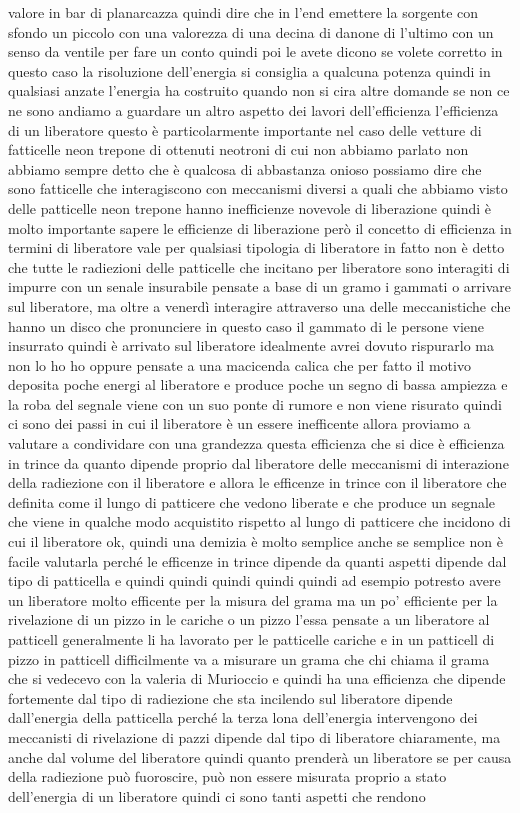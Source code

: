 valore in bar di planarcazza quindi dire che in l'end emettere la sorgente con sfondo un piccolo con una valorezza di una decina di danone di l'ultimo con un senso da ventile per fare un conto quindi poi le avete dicono se volete corretto in questo caso la risoluzione dell'energia si consiglia a qualcuna potenza quindi in qualsiasi anzate l'energia ha costruito quando non si cira altre domande se non ce ne sono andiamo a guardare un altro aspetto dei lavori dell'efficienza l'efficienza di un liberatore questo è particolarmente importante nel caso delle vetture di fatticelle neon trepone di ottenuti neotroni di cui non abbiamo parlato non abbiamo sempre detto che è qualcosa di abbastanza onioso possiamo dire che sono fatticelle che interagiscono con meccanismi diversi a quali che abbiamo visto delle patticelle neon trepone hanno inefficienze novevole di liberazione quindi è molto importante sapere le efficienze di liberazione però il concetto di efficienza in termini di liberatore vale per qualsiasi tipologia di liberatore in fatto non è detto che tutte le radiezioni delle patticelle che incitano per liberatore sono interagiti di impurre con un senale insurabile pensate a base di un gramo i gammati o arrivare sul liberatore, ma oltre a venerdì interagire attraverso una delle meccanistiche che hanno un disco che pronunciere in questo caso il gammato di le persone viene insurrato quindi è arrivato sul liberatore idealmente avrei dovuto rispurarlo ma non lo ho ho oppure pensate a una macicenda calica che per fatto il motivo deposita poche energi al liberatore e produce poche un segno di bassa ampiezza e la roba del segnale viene con un suo ponte di rumore e non viene risurato quindi ci sono dei passi in cui il liberatore è un essere inefficente allora proviamo a valutare a condividare con una grandezza questa efficienza che si dice è efficienza in trince da quanto dipende proprio dal liberatore delle meccanismi di interazione della radiezione con il liberatore e allora le efficenze in trince con il liberatore che definita come il lungo di patticere che vedono liberate e che produce un segnale che viene in qualche modo acquistito rispetto al lungo di patticere che incidono di cui il liberatore ok, quindi una demizia è molto semplice anche se semplice non è facile valutarla perché le efficenze in trince dipende da quanti aspetti dipende dal tipo di patticella e quindi quindi quindi quindi quindi ad esempio potresto avere un liberatore molto efficente per la misura del grama ma un po' efficiente per la rivelazione di un pizzo in le cariche o un pizzo l'essa pensate a un liberatore al patticell generalmente li ha lavorato per le patticelle cariche e in un patticell di pizzo in patticell difficilmente va a misurare un grama che chi chiama il grama che si vedecevo con la valeria di Murioccio e quindi ha una efficienza che dipende fortemente dal tipo di radiezione che sta incilendo sul liberatore dipende dall'energia della patticella perché la terza lona dell'energia intervengono dei meccanisti di rivelazione di pazzi dipende dal tipo di liberatore chiaramente, ma anche dal volume del liberatore quindi quanto prenderà un liberatore se per causa della radiezione può fuoroscire, può non essere misurata proprio a stato dell'energia di un liberatore quindi ci sono tanti aspetti che rendono 